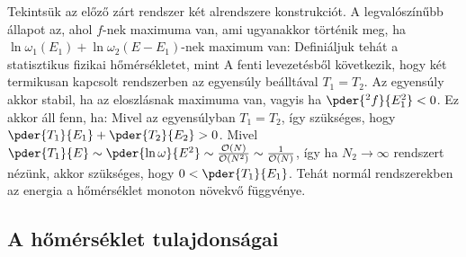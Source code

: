    Tekintsük az előző zárt rendszer két alrendszere konstrukciót.
   A legvalószínűbb állapot az, ahol $f$-nek maximuma van, ami ugyanakkor történik meg, ha $\ln\omega_1(E_1)+\ln\omega_2(E-E_1)$-nek maximum van:
   Definiáljuk tehát a statisztikus fizikai hőmérsékletet, mint
   A fenti levezetésből következik, hogy két termikusan kapcsolt rendszerben az egyensúly beálltával $T_1=T_2$.
   Az egyensúly akkor stabil, ha az eloszlásnak maximuma van, vagyis ha $\pder{^2f}{E_1^2}<0$.
   Ez akkor áll fenn, ha:
   Mivel az egyensúlyban $T_1=T_2$, így szükséges, hogy $\pder{T_1}{E_1}+\pder{T_2}{E_2}>0$.
   Mivel $\pder{T_1}{E}\sim\pder{\ln\omega}{E^2}\sim\frac{\mathcal{O}(N)}{\mathcal{O}(N^2)}\sim\frac{1}{\mathcal{O}(N)}$, így ha $N_2\to\infty$ rendszert nézünk, akkor szükséges, hogy $0<\pder{T_1}{E_1}$.
   Tehát normál rendszerekben az energia a hőmérséklet monoton növekvő függvénye.
   
  \subsection{A hőmérséklet tulajdonságai}
   
